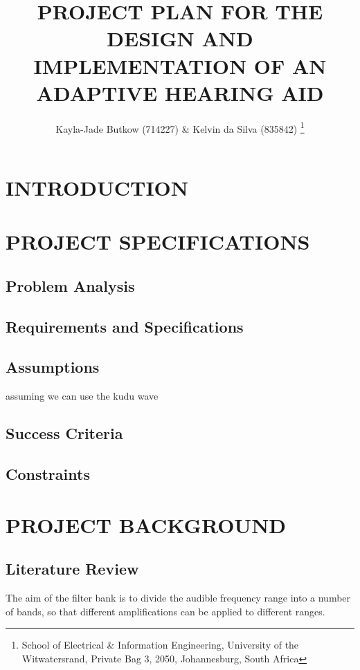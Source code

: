 \documentclass[10pt,twocolumn]{witseiepaper}
\begin{document}
\title{PROJECT PLAN FOR THE DESIGN AND IMPLEMENTATION OF AN ADAPTIVE HEARING AID}

\author{Kayla-Jade Butkow (714227) \& Kelvin da Silva (835842) 
\thanks{School of Electrical \& Information Engineering, University of the
Witwatersrand, Private Bag 3, 2050, Johannesburg, South Africa}
}


%
\abstract{ }

\keywords{}

\maketitle
\thispagestyle{empty}
\pagestyle{plain}
\setcounter{page}{1}

%
\section{INTRODUCTION}

\section{PROJECT SPECIFICATIONS}
\subsection{Problem Analysis}
\subsection{Requirements and Specifications}
\subsection{Assumptions}
assuming we can use the kudu wave
\subsection{Success Criteria}
\subsection{Constraints}

\section{PROJECT BACKGROUND}
\subsection{Literature Review}
The aim of the filter bank is to divide the audible frequency range into a number of bands, so that different amplifications can be applied to different ranges.
\end{document}
